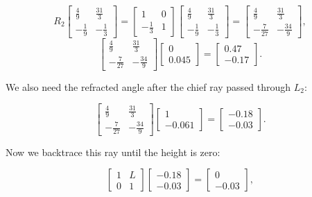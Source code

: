 \documentclass[a4paper]{article}
\begin{document}
$$R_2
\begin{bmatrix}
    \frac{4}{9} & \frac{31}{3}\\
    - \frac{1}{9} & - \frac{1}{3}
\end{bmatrix} = 
\begin{bmatrix}
    1 & 0\\
    - \frac{1}{3} & 1
\end{bmatrix} 
\begin{bmatrix}
    \frac{4}{9} & \frac{31}{3}\\
    - \frac{1}{9} & - \frac{1}{3}
\end{bmatrix} = 
\begin{bmatrix}
    \frac{4}{9} & \frac{31}{3}\\
    - \frac{7}{27} & - \frac{34}{9}
\end{bmatrix},
$$
$$
\begin{bmatrix}
    \frac{4}{9} & \frac{31}{3}\\
    - \frac{7}{27} & - \frac{34}{9}
\end{bmatrix}
\begin{bmatrix}
    0   \\
    0.045
\end{bmatrix}
=
\begin{bmatrix}
    0.47\\
    -0.17 
\end{bmatrix}.
$$


We also need the refracted angle after the chief ray passed through $L_2$:

$$
\begin{bmatrix}
    \frac{4}{9} & \frac{31}{3}\\
    - \frac{7}{27} & - \frac{34}{9}
\end{bmatrix}
\begin{bmatrix}
    1   \\
    -0.061
\end{bmatrix}
=
\begin{bmatrix}
    -0.18\\
    -0.03
\end{bmatrix}.
$$

Now we backtrace this ray until the height is zero:

$$ 
\begin{bmatrix}
    1 & L\\
    0 & 1
\end{bmatrix}
\begin{bmatrix}
    -0.18\\
    -0.03
\end{bmatrix}
=
\begin{bmatrix}
    0 \\
    -0.03
\end{bmatrix},
$$
\end{document}
